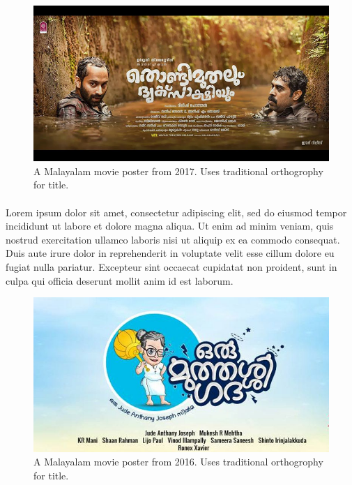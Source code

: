 \documentclass[10pt]{article}
\begin{document}
\begin{figure}[h!]
 \centering
  \includegraphics[width=1.0\textwidth]{images/2017-movieposter-Thondimuthal}
 \caption{A Malayalam movie poster from 2017. Uses traditional orthogrophy for title.}
\end{figure}
\paragraph{}
Lorem ipsum dolor sit amet, consectetur adipiscing elit, sed do eiusmod tempor incididunt ut labore et dolore magna aliqua. Ut enim ad minim veniam, quis nostrud exercitation ullamco laboris nisi ut aliquip ex ea commodo consequat. Duis aute irure dolor in reprehenderit in voluptate velit esse cillum dolore eu fugiat nulla pariatur. Excepteur sint occaecat cupidatat non proident, sunt in culpa qui officia deserunt mollit anim id est laborum.

\begin{figure}[h!]
 \centering
  \includegraphics[width=1.0\textwidth]{images/2016-oru-muthashi-gadha}
 \caption{A Malayalam movie poster from 2016. Uses traditional orthogrophy for title.}
\end{figure}
\end{document}
